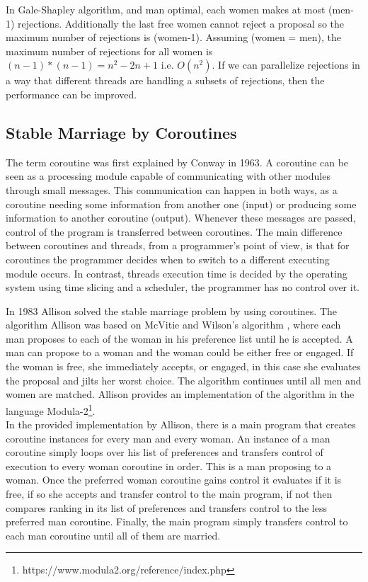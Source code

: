 In Gale-Shapley algorithm, and man optimal, each women makes at most (men-1) rejections. Additionally the last free women cannot reject a proposal so the maximum number of rejections is (women-1). Assuming (women = men), the maximum number of rejections for all women is $(n-1)*(n-1) = n^2 - 2n +1$ i.e. $O(n^2)$. If we can parallelize rejections in a way that different threads are handling a subsets of rejections, then the performance can be improved. 

\subsection{Stable Marriage by Coroutines}

The term coroutine was first explained by Conway in 1963\cite{conway1963design}. A coroutine can be seen as a processing module capable of communicating with other modules through small messages. This communication can happen in both ways, as a coroutine needing some information from another one (input) or producing some information to another coroutine (output). Whenever these messages are passed, control of the program is transferred between coroutines. The main difference between coroutines and threads, from a programmer's point of view, is that for coroutines the programmer decides when to switch to a different executing module occurs. In contrast, threads execution time is decided by the operating system using time slicing and a scheduler, the programmer has no control over it.

In 1983 Allison \cite{allison1983stable} solved the stable marriage problem by using coroutines. The algorithm Allison was based on McVitie and Wilson's algorithm \cite{mcvitie1971stable}, where each man proposes to each of the woman in his preference list until he is accepted. A man can propose to a woman and the woman could be either free or engaged. If the woman is free, she immediately accepts, or engaged, in this case she evaluates the proposal and jilts her worst choice. The algorithm continues until all men and women are matched. Allison provides an implementation of the algorithm in the language Modula-2\footnote{https://www.modula2.org/reference/index.php}.\\
In the provided implementation by Allison, there is a main program that creates coroutine instances for every man and every woman. An instance of a man coroutine simply loops over his list of preferences and transfers control of execution to every woman coroutine in order. This is a man proposing to a woman. Once the preferred woman coroutine gains control it evaluates if it is free, if so she accepts and transfer control to the main program, if not then compares ranking in its list of preferences and transfers control to the less preferred man coroutine. Finally, the main program simply transfers control to each man coroutine until all of them are married. 

